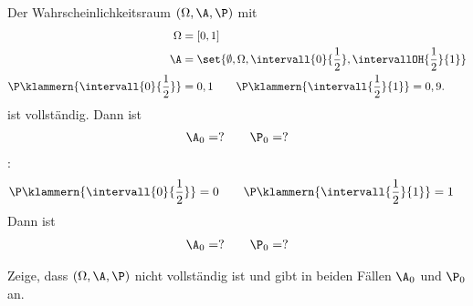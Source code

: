 \begin{beisp}
	Der Wahrscheinlichkeitsraum $(\Omega,\A,\P)$ mit
	\begin{align*}
		\Omega&=[0,1]\\
		\A&=\set{\emptyset,\Omega,\intervall{0}{\frac{1}{2}},\intervallOH{\frac{1}{2}}{1}}\\
		\P\klammern{\intervall{0}{\frac{1}{2}}}&=0,1\qquad\P\klammern{\intervall{\frac{1}{2}}{1}}=0,9.
	\end{align*}		
	ist  vollständig.
	 Dann ist
	 \begin{align*}
	 	\A_0=?\qquad\P_0=?
	 \end{align*}
	 :
	 \begin{align*}
	 	\P\klammern{\intervall{0}{\frac{1}{2}}}&=0\qquad\P\klammern{\intervall{\frac{1}{2}}{1}}=1
	 \end{align*}
	  Dann ist
	 \begin{align*}
	 	\A_0=?\qquad\P_0=?
	 \end{align*}

	\begin{aufgabenr}\label{aufg:4}\enter
	 	Zeige, dass $(\Omega,\A,\P)$ nicht vollständig ist und gibt in beiden Fällen $\A_0$ und $\P_0$ an.
	\end{aufgabenr}
\end{beisp}

